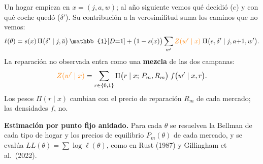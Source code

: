 \documentclass[border=0pt]{standalone}
\newcommand{\no}[1]{{\color{orange}#1}}
\begin{document}
\begin{minipage}{26.783cm}\fontsize{27}{33.5}\selectfont\raggedright 
Un hogar empieza en $x=(j,a,w)$; al año siguiente vemos qué decidió ($e$) y con qué
coche quedó ($\delta'$). Su contribución a la verosimilitud suma los caminos que no
vemos:
\[ \ell(\theta)=s(x)\,\Pi\big(\delta'\mid j,\bar a\big)\,\mathbb{1}[D{=}1]
   +\big(1-s(x)\big)\sum_{w'}\no{Z(w'\mid x)}\;\Pi\big(e,\delta'\mid j,a{+}1,w'\big). \]
La reparación no observada entra como una \textbf{mezcla} de las dos campanas:
\[ \no{Z(w'\mid x)}=\sum_{r\in\{0,1\}}\Pi\big(r\mid x;\,P_m,R_m\big)\;
   f\big(w'\mid x,r\big). \]
Los pesos $\Pi(r\mid x)$ cambian con el precio de reparación $R_m$ de cada mercado;
las densidades $f$, no.

\textbf{Estimación por punto fijo anidado.} Para cada $\theta$ se resuelven la
Bellman de cada tipo de hogar y los precios de equilibrio $P_m(\theta)$ de cada
mercado, y se evalúa $LL(\theta)=\sum\log\ell(\theta)$, como en Rust (1987) y
Gillingham et al.\ (2022).
\end{minipage}
\end{document}
